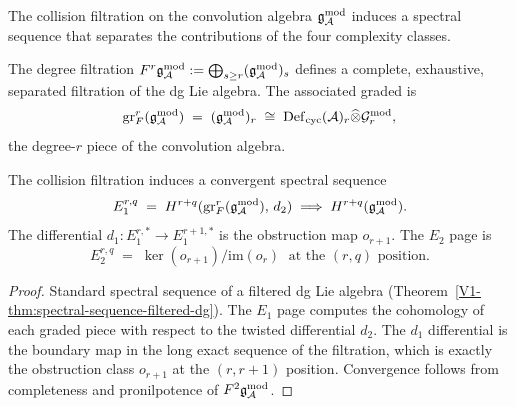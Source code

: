 The collision filtration on the convolution algebra
$\mathfrak{g}_{\mathcal{A}}^{\mathrm{mod}}$ induces a spectral sequence that separates the
contributions of the four complexity classes.

\begin{construction}
The degree filtration
$F^r\mathfrak{g}_{\mathcal{A}}^{\mathrm{mod}} := \bigoplus_{s \geq r}(\mathfrak{g}_{\mathcal{A}}^{\mathrm{mod}})_s$
defines a complete, exhaustive, separated filtration
of the dg Lie algebra. The associated graded is
\begin{equation}%
\operatorname{gr}^r_F(\gAmod)
\;=\;
(\gAmod)_r
\;\cong\;
\Defcyc(\cA)_r \widehat\otimes \Gmod_r,
\end{equation}
the degree-$r$ piece of the convolution algebra.
\end{construction}

\begin{theorem}
\ClaimStatusProvedHere
{}
The collision filtration induces a convergent spectral sequence
\begin{equation}%
E_1^{r,q}
\;=\;
H^{r+q}(\operatorname{gr}^r_F(\gAmod),\, d_2)
\;\Longrightarrow\;
H^{r+q}(\gAmod).
\end{equation}
The differential $d_1\colon E_1^{r,*} \to E_1^{r+1,*}$ is
the obstruction map $o_{r+1}$. The $E_2$ page is
\begin{equation}%
E_2^{r,q}
\;=\;
\ker(o_{r+1})/\mathrm{im}(o_r)
\;\text{ at the $(r,q)$ position.}
\end{equation}
\end{theorem}

\begin{proof}
Standard spectral sequence of a filtered dg Lie algebra
(Theorem~\ref{V1-thm:spectral-sequence-filtered-dg}). The
$E_1$ page computes the cohomology of each graded piece
with respect to the twisted differential $d_2$. The
$d_1$ differential is the boundary map in the long exact
sequence of the filtration, which is exactly the
obstruction class $o_{r+1}$ at the $(r, r+1)$ position.
Convergence follows from completeness and pronilpotence of
$F^2\mathfrak{g}_{\mathcal{A}}^{\mathrm{mod}}$.
\end{proof}

